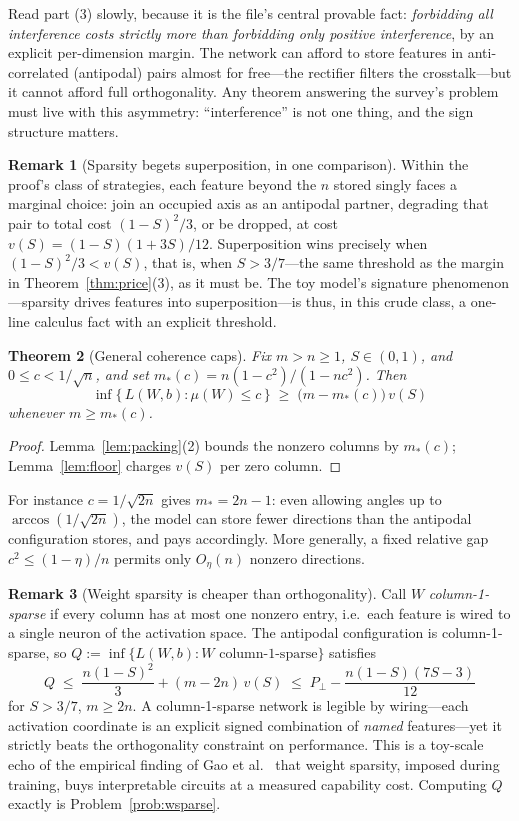 \documentclass[11pt]{amsart}
\theoremstyle{plain}
\newtheorem{theorem}{Theorem}[section]
\theoremstyle{definition}
\newtheorem{remark}[theorem]{Remark}
\begin{document}
Read part (3) slowly, because it is the file's central provable fact: \emph{forbidding all interference costs strictly more than forbidding only positive interference}, by an explicit per-dimension margin. The network can afford to store features in anti-correlated (antipodal) pairs almost for free---the rectifier filters the crosstalk---but it cannot afford full orthogonality. Any theorem answering the survey's problem must live with this asymmetry: ``interference'' is not one thing, and the sign structure matters.

\begin{remark}[Sparsity begets superposition, in one comparison]\label{rem:threshold}
Within the proof's class of strategies, each feature beyond the $n$ stored singly faces a marginal choice: join an occupied axis as an antipodal partner, degrading that pair to total cost $(1-S)^2/3$, or be dropped, at cost $v(S)=(1-S)(1+3S)/12$. Superposition wins precisely when $(1-S)^2/3 < v(S)$, that is, when $S>3/7$---the same threshold as the margin in Theorem~\ref{thm:price}(3), as it must be. The toy model's signature phenomenon---sparsity drives features into superposition---is thus, in this crude class, a one-line calculus fact with an explicit threshold.
\end{remark}

\begin{theorem}[General coherence caps]\label{thm:cap}
Fix $m>n\ge1$, $S\in(0,1)$, and $0\le c<1/\sqrt n$, and set $m_*(c) = n(1-c^2)/(1-nc^2)$. Then
\[
\inf\{\,L(W,b) : \mu(W)\le c\,\} \;\ge\; \bigl(m-m_*(c)\bigr)\,v(S)
\]
whenever $m\ge m_*(c)$.
\end{theorem}

\begin{proof}
Lemma~\ref{lem:packing}(2) bounds the nonzero columns by $m_*(c)$; Lemma~\ref{lem:floor} charges $v(S)$ per zero column.
\end{proof}

For instance $c=1/\sqrt{2n}$ gives $m_*=2n-1$: even allowing angles up to $\arccos(1/\sqrt{2n})$, the model can store fewer directions than the antipodal configuration stores, and pays accordingly. More generally, a fixed relative gap $c^2\le(1-\eta)/n$ permits only $O_\eta(n)$ nonzero directions.

\begin{remark}[Weight sparsity is cheaper than orthogonality]\label{rem:wsparse}
Call $W$ \emph{column-1-sparse} if every column has at most one nonzero entry, i.e.\ each feature is wired to a single neuron of the activation space. The antipodal configuration is column-1-sparse, so $Q := \inf\{L(W,b): W \text{ column-1-sparse}\}$ satisfies
\[
Q \;\le\; \frac{n(1-S)^2}{3}+(m-2n)\,v(S) \;\le\; P_\perp - \frac{n(1-S)(7S-3)}{12}
\]
for $S>3/7$, $m\ge 2n$. A column-1-sparse network is legible by wiring---each activation coordinate is an explicit signed combination of \emph{named} features---yet it strictly beats the orthogonality constraint on performance. This is a toy-scale echo of the empirical finding of Gao et al.~\cite{gao2025} that weight sparsity, imposed during training, buys interpretable circuits at a measured capability cost. Computing $Q$ exactly is Problem~\ref{prob:wsparse}.
\end{remark}
\end{document}
